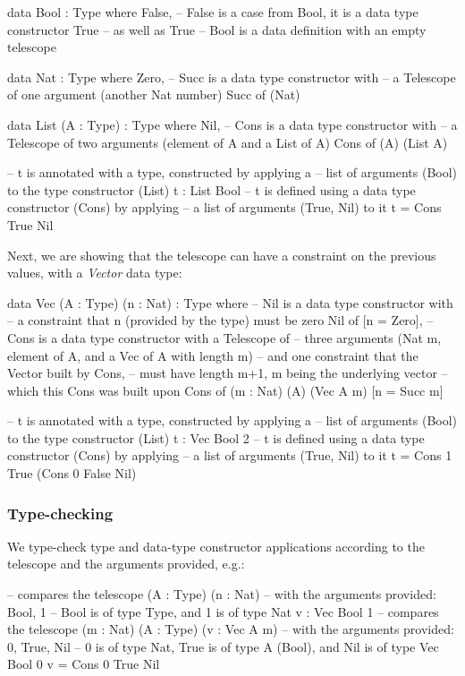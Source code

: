 \begin{piforall}
data Bool : Type where {
       False,  -- False is a case from Bool, it is a data type constructor
       True    -- as well as True
} -- Bool is a data definition with an empty telescope

data Nat : Type where {
       Zero,
       -- Succ is a data type constructor with
       -- a Telescope of one argument (another Nat number)
       Succ of (Nat)
}

data List (A : Type) : Type where {
       Nil,
       -- Cons is a data type constructor with
       -- a Telescope of two arguments (element of A and a List of A)
       Cons of (A) (List A)
}

-- t is annotated with a type, constructed by applying a
-- list of arguments (Bool) to the type constructor (List)
t : List Bool
-- t is defined using a data type constructor (Cons) by applying
-- a list of arguments (True, Nil) to it
t = Cons True Nil
\end{piforall}

Next, we are showing that the telescope can have a constraint on the previous values, with a \emph{Vector} data type:

\begin{piforall}
data Vec (A : Type) (n : Nat) : Type where {
  -- Nil is a data type constructor with
  -- a constraint that n (provided by the type) must be zero
  Nil of [n = Zero],
  -- Cons is a data type constructor with a Telescope of 
  -- three arguments (Nat m, element of A, and a Vec of A with length m)
  -- and one constraint that the Vector built by Cons,
  -- must have length m+1, m being the underlying vector
  -- which this Cons was built upon
  Cons of (m : Nat) (A) (Vec A m) [n = Succ m]
}

-- t is annotated with a type, constructed by applying a
-- list of arguments (Bool) to the type constructor (List)
t : Vec Bool 2
-- t is defined using a data type constructor (Cons) by applying
-- a list of arguments (True, Nil) to it
t = Cons 1 True (Cons 0 False Nil)
\end{piforall}

\subsubsection{Type-checking}

We type-check type and data-type constructor applications according to the telescope and the arguments provided, e.g.:

\begin{piforall}
-- compares the telescope (A : Type) (n : Nat)
-- with the arguments provided: Bool, 1
-- Bool is of type Type, and 1 is of type Nat
v : Vec Bool 1
-- compares the telescope (m : Nat) (A : Type) (v : Vec A m)
-- with the arguments provided: 0, True, Nil
-- 0 is of type Nat, True is of type A (Bool), and Nil is of type Vec Bool 0
v = Cons 0 True Nil
\end{piforall}

